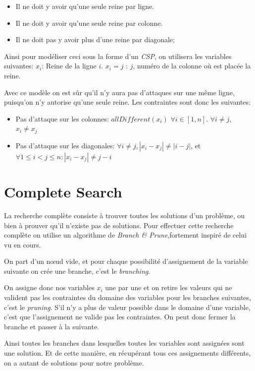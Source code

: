 \documentclass{article}
\begin{document}
\begin{itemize}
\item Il ne doit y avoir qu'une seule reine par ligne.
\item Il ne doit y avoir qu'une seule reine par colonne.
\item Il ne doit pas y avoir plus d'une reine par diagonale;
\end{itemize}

Ainsi pour modéliser ceci sous la forme d'un \emph{CSP}, on utilisera les variables suivantes:
$x_i$: Reine de la ligne $i$.
$x_i = j$ : $j$, numéro de la colonne où est placée la reine.

Avec ce modèle on est sûr qu'il n'y aura pas d'attaques sur une même ligne, puisqu'on n'y autorise qu'une seule reine.
Les contraintes sont donc les suivantes:
\begin{itemize}
\item Pas d'attaque sur les colonnes: $allDifferent(x_i)$ $\forall i \in [1, n]$. $\forall i \neq j$, $x_i \neq x_j$

\item Pas d'attaque sur les diagonales:  $\forall i \neq j, |x_i - x_j| \neq |i - j|$, et $\forall  1 \leq i < j \leq n : |x_i - x_j | \neq j - i$
\end{itemize}


\section{Complete Search}

La recherche complète consiste à trouver toutes les solutions d'un problème, ou bien à prouver qu'il n'existe pas de solutions. 
Pour effectuer cette recherche complète on utilise un algorithme de \emph{Branch \& Prune},fortement inspiré de celui vu en cours. 

On part d'un nœud vide, et pour chaque possibilité d'assignement de la variable suivante on crée une branche, c'est le \emph{branching}.

On assigne donc nos variables $x_i$ une par une et on retire les valeurs qui ne valident pas les contraintes du domaine des variables pour les branches suivantes, c'est le \emph{pruning}. S'il n'y a plus de valeur possible dans le domaine d'une variable, c'est que l'assignement ne valide pas les contraintes. On peut donc fermer la branche et passer à la suivante.

Ainsi toutes les branches dans lesquelles toutes les variables sont assignées sont une solution. Et de cette manière, en récupérant tous ces assignements différents, on a autant de solutions pour notre problème. 
\end{document}

